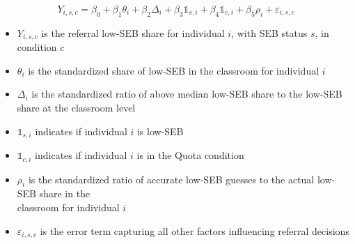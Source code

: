 \documentclass[11pt,a4paper,oneside]{article}
\begin{document}
\begin{equation}
Y_{i,s,c} = \beta_0 + \beta_1 \theta_i + \beta_2 \Delta_{i} + \beta_3 \mathds{1}_{s,i} + \beta_4 \mathds{1}_{c,i} + \beta_5 \rho_i + \varepsilon_{i,s,c}
\end{equation}
\begin{itemize}
  \item $Y_{i,s,c}$ is the referral low-SEB share for individual $i$, with SEB status $s$, in condition $c$
  \item $\theta_i$ is the standardized share of low-SEB in the classroom for individual $i$
  \item $\Delta_{i}$ is the standardized ratio of above median low-SEB share to the  low-SEB share at the classroom level
  \item $\mathds{1}_{s,i}$ indicates if individual $i$ is low-SEB
  \item $\mathds{1}_{c,i}$ indicates if individual $i$ is in the Quota condition
  \item $\rho_i$ is the standardized ratio of accurate low-SEB guesses to the actual low-SEB share in the \\ classroom for individual $i$
  \item $\varepsilon_{i,s,c}$ is the error term capturing all other factors influencing referral decisions
\end{itemize}
\end{document}
